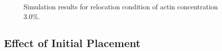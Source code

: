 \documentclass[a4paper,12pt]{book}
\begin{document}
\begin{figure}[h]
{ }%
 \caption{Simulation results for relocation condition of actin concentration 3.0\%.}
 \label{fig:res6}
\end{figure}

\subsection{Effect of Initial Placement}
\end{document}
